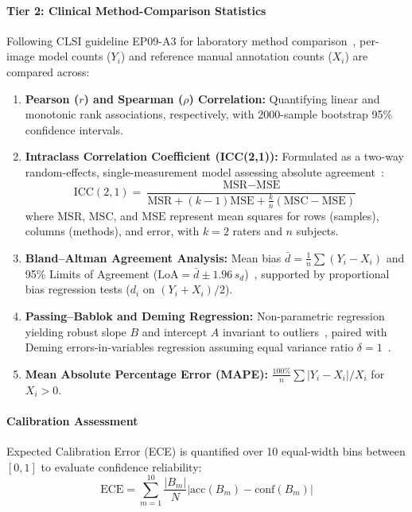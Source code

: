\documentclass[10pt,conference]{IEEEtran}
\begin{document}
\paragraph{Tier 2: Clinical Method-Comparison Statistics}
Following CLSI guideline EP09-A3 for laboratory method comparison~\cite{clsi2013}, per-image model counts ($Y_i$) and reference manual annotation counts ($X_i$) are compared across:
\begin{enumerate}
  \item \textbf{Pearson ($r$) and Spearman ($\rho$) Correlation:} Quantifying linear and monotonic rank associations, respectively, with 2000-sample bootstrap 95\% confidence intervals.
  \item \textbf{Intraclass Correlation Coefficient (ICC(2,1)):} Formulated as a two-way random-effects, single-measurement model assessing absolute agreement~\cite{koo2016}:
  \begin{equation}
  \text{ICC}(2,1) = \frac{\text{MSR} - \text{MSE}}{\text{MSR} + (k-1)\text{MSE} + \frac{k}{n}(\text{MSC} - \text{MSE})}
  \end{equation}
  where $\text{MSR}$, $\text{MSC}$, and $\text{MSE}$ represent mean squares for rows (samples), columns (methods), and error, with $k=2$ raters and $n$ subjects.
  \item \textbf{Bland--Altman Agreement Analysis:} Mean bias $\bar{d} = \frac{1}{n}\sum (Y_i - X_i)$ and 95\% Limits of Agreement ($\text{LoA} = \bar{d} \pm 1.96\,s_d$)~\cite{bland1986}, supported by proportional bias regression tests ($d_i$ on $(Y_i + X_i)/2$).
  \item \textbf{Passing--Bablok and Deming Regression:} Non-parametric regression yielding robust slope $B$ and intercept $A$ invariant to outliers~\cite{passing1983}, paired with Deming errors-in-variables regression assuming equal variance ratio $\delta=1$~\cite{deming1943}.
  \item \textbf{Mean Absolute Percentage Error (MAPE):} $\frac{100\%}{n}\sum |Y_i - X_i| / X_i$ for $X_i > 0$.
\end{enumerate}

\paragraph{Calibration Assessment}
Expected Calibration Error (ECE) is quantified over 10 equal-width bins between $[0, 1]$ to evaluate confidence reliability:
\begin{equation}
\text{ECE} = \sum_{m=1}^{10} \frac{|B_m|}{N} \left| \text{acc}(B_m) - \text{conf}(B_m) \right|
\end{equation}
\end{document}

